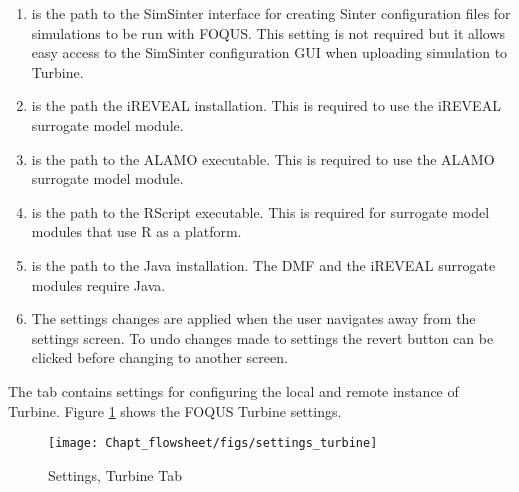 \begin{enumerate}
	\item {} is the path to the SimSinter interface for creating Sinter configuration files for simulations to be run with FOQUS. This setting is not required but it allows easy access to the SimSinter configuration GUI when uploading simulation to Turbine.
	\item {} is the path the iREVEAL installation. This is required to use the iREVEAL surrogate model module.
	\item {} is the path to the ALAMO executable. This is required to use the ALAMO surrogate model module.
	\item {} is the path to the RScript executable. This is required for surrogate model modules that use R as a platform.
	\item {} is the path to the Java installation. The DMF and the iREVEAL surrogate modules require Java.
	\item {} The settings changes are applied when the user navigates away from the settings screen. To undo changes made to settings the revert button can be clicked before changing to another screen.
\end{enumerate}


The  tab contains settings for configuring the local and remote instance of Turbine. Figure \ref{fig.settings.turbine} shows the FOQUS Turbine settings.

\begin{figure}[H]
	\begin{center}
		\texttt{[image: Chapt\_flowsheet/figs/settings\_turbine]}
		\caption{Settings, Turbine Tab}
		\label{fig.settings.turbine}
	\end{center}
\end{figure}

